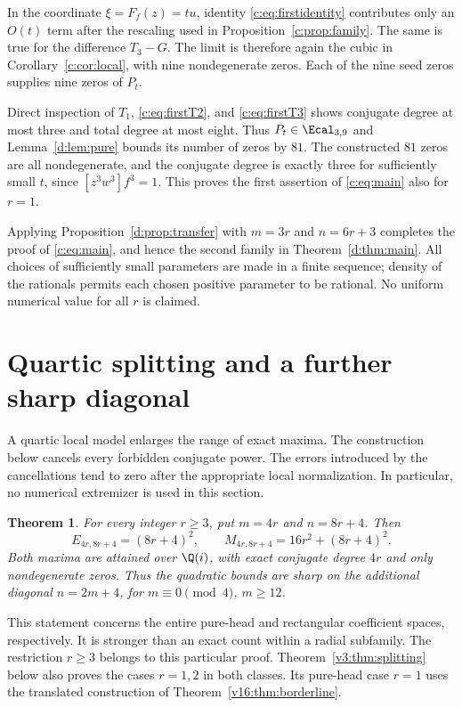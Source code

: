\documentclass[UTF8,11pt]{ctexart}
\newtheorem{thm}{Theorem}[section]
\theoremstyle{definition}
\numberwithin{equation}{section}
\begin{document}
In the coordinate $\xi=F_f(z)=tu$, identity
\eqref{c:eq:firstidentity} contributes only an $O(t)$ term after the
rescaling used in Proposition~\ref{c:prop:family}. The same is true for
the difference $T_3-G$. The limit is therefore again the cubic in
Corollary~\ref{c:cor:local}, with nine nondegenerate zeros. Each of the
nine seed zeros supplies nine zeros of $P_t$.

Direct inspection of $T_1$, \eqref{c:eq:firstT2}, and
\eqref{c:eq:firstT3} shows conjugate degree at most three and total
degree at most eight. Thus $P_t\in\Ecal_{3,9}$ and
Lemma~\ref{d:lem:pure} bounds its number of zeros by $81$. The constructed
$81$ zeros are all nondegenerate, and the conjugate degree is exactly
three for sufficiently small $t$, since $[z^3w^3]f^3=1$.
This proves the first assertion of \eqref{c:eq:main} also for $r=1$.


Applying Proposition~\ref{d:prop:transfer} with $m=3r$ and $n=6r+3$
completes the proof of \eqref{c:eq:main}, and hence the second family
in Theorem~\ref{d:thm:main}. All choices of sufficiently small parameters
are made in a finite sequence; density of the rationals permits each
chosen positive parameter to be rational. No uniform numerical value
for all $r$ is claimed.

\section{Quartic splitting and a further sharp diagonal}\label{v2:sec:quartic}

A quartic local model enlarges the range of exact maxima. The construction
below cancels every forbidden conjugate power. The errors introduced by
the cancellations tend to zero after the appropriate local normalization.
In particular, no numerical extremizer is used in this section.

\begin{thm}\label{v2:thm:main}
For every integer $r\ge3$, put $m=4r$ and $n=8r+4$. Then
\begin{equation}\label{v2:eq:main}
 E_{4r,8r+4}=(8r+4)^2,\qquad
 M_{4r,8r+4}=16r^2+(8r+4)^2.
\end{equation}
Both maxima are attained over $\Q(i)$, with exact conjugate degree $4r$
and only nondegenerate zeros. Thus the quadratic bounds are sharp on
the additional diagonal $n=2m+4$, for $m\equiv0\pmod4$, $m\ge12$.
\end{thm}

This statement concerns the entire pure-head and rectangular coefficient
spaces, respectively. It is stronger than an exact count within a radial
subfamily. The restriction $r\ge3$ belongs to this particular proof.
Theorem~\ref{v3:thm:splitting} below also proves the cases
$r=1,2$ in both classes. Its pure-head case $r=1$ uses the
translated construction of Theorem~\ref{v16:thm:borderline}.
\end{document}
